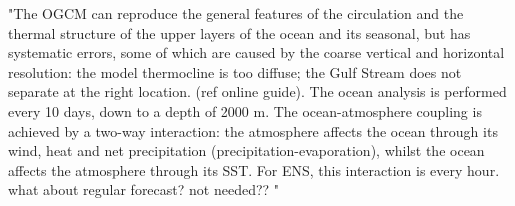 
"The OGCM can reproduce the general features of the circulation and the thermal structure of the upper layers of the ocean and its seasonal, but has systematic errors, some of which are caused by the coarse vertical and horizontal resolution: the model thermocline is too diffuse; the Gulf Stream does not separate at the right location. (ref online guide).
The ocean analysis is performed every 10 days, down to a depth of 2000 m. The ocean-atmosphere coupling is achieved by a two-way interaction: the atmosphere affects the ocean through its wind, heat and net precipitation (precipitation-evaporation), whilst the ocean affects the atmosphere through its SST. For ENS, this interaction is every hour. what about regular forecast? not needed?? "


